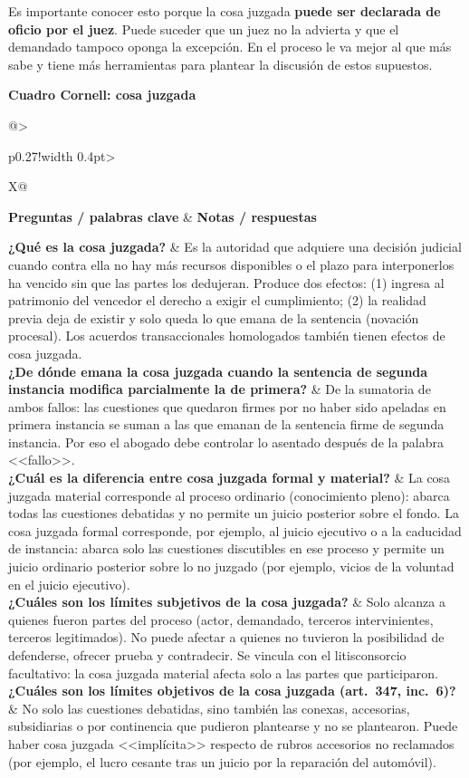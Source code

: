 \documentclass[12pt,oneside]{book}
\makeatletter
\newcommand{\cornelltitle}[1]{\par\bigskip\noindent\textbf{\sffamily Cuadro Cornell: #1}\par\nopagebreak\smallskip}
\newcommand{\cqrow}[2]{\textbf{#1} & #2 \\[0.5em]}
\newcommand{\cornellblock}[1]{%
  \noindent\begin{tabularx}{\textwidth}{@{}>{\raggedright\arraybackslash}p{0.27\textwidth}!{\vrule width 0.4pt}>{\raggedright\arraybackslash}X@{}}
  \toprule
  \textbf{Preguntas / palabras clave} & \textbf{Notas / respuestas} \\
  \midrule
  #1
  \bottomrule
  \end{tabularx}\par}
\makeatother
\begin{document}
Es importante conocer esto porque la cosa juzgada \textbf{puede ser declarada de oficio por el juez}. Puede suceder que un juez no la advierta y que el demandado tampoco oponga la excepción. En el proceso le va mejor al que más sabe y tiene más herramientas para plantear la discusión de estos supuestos.

\cornelltitle{cosa juzgada}
\cornellblock{
\cqrow{¿Qué es la cosa juzgada?}{Es la autoridad que adquiere una decisión judicial cuando contra ella no hay más recursos disponibles o el plazo para interponerlos ha vencido sin que las partes los dedujeran. Produce dos efectos: (1) ingresa al patrimonio del vencedor el derecho a exigir el cumplimiento; (2) la realidad previa deja de existir y solo queda lo que emana de la sentencia (novación procesal). Los acuerdos transaccionales homologados también tienen efectos de cosa juzgada.
}
\cqrow{¿De dónde emana la cosa juzgada cuando la sentencia de segunda instancia modifica parcialmente la de primera?}{De la sumatoria de ambos fallos: las cuestiones que quedaron firmes por no haber sido apeladas en primera instancia se suman a las que emanan de la sentencia firme de segunda instancia. Por eso el abogado debe controlar lo asentado después de la palabra <<fallo>>.
}
\cqrow{¿Cuál es la diferencia entre cosa juzgada formal y material?}{La cosa juzgada material corresponde al proceso ordinario (conocimiento pleno): abarca todas las cuestiones debatidas y no permite un juicio posterior sobre el fondo. La cosa juzgada formal corresponde, por ejemplo, al juicio ejecutivo o a la caducidad de instancia: abarca solo las cuestiones discutibles en ese proceso y permite un juicio ordinario posterior sobre lo no juzgado (por ejemplo, vicios de la voluntad en el juicio ejecutivo).
}
\cqrow{¿Cuáles son los límites subjetivos de la cosa juzgada?}{Solo alcanza a quienes fueron partes del proceso (actor, demandado, terceros intervinientes, terceros legitimados). No puede afectar a quienes no tuvieron la posibilidad de defenderse, ofrecer prueba y contradecir. Se vincula con el litisconsorcio facultativo: la cosa juzgada material afecta solo a las partes que participaron.
}
\cqrow{¿Cuáles son los límites objetivos de la cosa juzgada (art.~347, inc.~6\textordmasculine)?}{No solo las cuestiones debatidas, sino también las conexas, accesorias, subsidiarias o por continencia que pudieron plantearse y no se plantearon. Puede haber cosa juzgada <<implícita>> respecto de rubros accesorios no reclamados (por ejemplo, el lucro cesante tras un juicio por la reparación del automóvil).
}
}
\medskip
\end{document}
